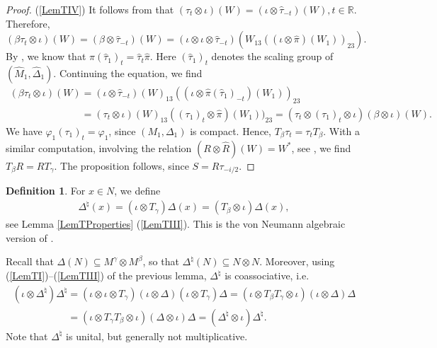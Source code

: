 \documentclass[pdftex]{sigma}
\numberwithin{equation}{section}
\theoremstyle{definition}
\newtheorem{dfn}[thm]{Definition}
\begin{document}
\begin{proof}
(\ref{LemTIV})
It follows from \cite[Proposition 2.1, Corollary 2.2]{KusVaeII} that $(\tau_t \otimes \iota)(W) = (\iota \otimes \hat{\tau}_{-t})(W), t \in \mathbb{R}$. Therefore,
\[
(\beta \tau_t \otimes \iota)(W) = (\beta \otimes \hat{\tau}_{-t})(W) = (\iota \otimes \iota \otimes \hat{\tau}_{-t})(W_{13}((\iota \otimes \hat{\pi})(W_1))_{23}).
\]
By \cite[Proposition 5.45]{KusVae}, we know that $\hat{\pi}(\hat{\tau}_1)_t = \hat{\tau}_t \hat{\pi}$. Here $(\hat{\tau}_1)_t$ denotes the scaling group of $(\hat{M}_1, \hat{\Delta}_1)$. Continuing the equation, we f\/ind
\begin{gather*}
  (\beta \tau_t \otimes \iota)(W)  = (\iota \otimes \hat{\tau}_{-t})(W)_{13} ((\iota \otimes   \hat{\pi}(\hat{\tau}_1)_{-t})(W_1))_{23} \\
\phantom{(\beta \tau_t \otimes \iota)(W)}{}
=  (\tau_t \otimes \iota)(W)_{13} ((\tau_1)_{t}\otimes \hat{\pi})(W_1))_{23} =
(\tau_t \otimes (\tau_1)_{t} \otimes \iota) (\beta \otimes \iota)(W).
\end{gather*}
We have $\varphi_1 (\tau_1)_t =  \varphi_1$, since $(M_1, \Delta_1)$ is compact. Hence, $T_\beta \tau_t = \tau_t T_\beta$. With a similar computation, involving the relation $(R \otimes \hat{R})(W) = W^\ast$, see \cite[Proposition 2.1, Corollary 2.2]{KusVaeII}, we f\/ind $T_\beta R = R T_\gamma$. The proposition follows, since $S = R \tau_{-i/2}$.
\end{proof}

\begin{dfn}
For $x \in N$, we def\/ine
\begin{gather}\label{EqnShiftedCom}
\Delta^\natural(x) = (\iota \otimes T_\gamma) \Delta(x) = (T_\beta \otimes \iota) \Delta(x),
\end{gather}
 see Lemma \ref{LemTProperties} (\ref{LemTIII}). This is the von Neumann algebraic version of \cite[equation~(4)]{VaiHyp}.
\end{dfn}
  Recall that $\Delta(N) \subseteq M^\gamma \otimes M^\beta$, so that $\Delta^\natural(N) \subseteq N \otimes N$. Moreover, using (\ref{LemTI})--(\ref{LemTIII}) of the previous lemma, $\Delta^\natural$ is coassociative, i.e.
\begin{gather}
   (\iota \otimes \Delta^\natural) \Delta^\natural  = (\iota \otimes \iota \otimes T_\gamma)(\iota \otimes \Delta)(\iota \otimes T_\gamma)\Delta
 = (\iota \otimes T_\beta   T_\gamma \otimes \iota) (\iota \otimes \Delta) \Delta \nonumber\\
\phantom{(\iota \otimes \Delta^\natural) \Delta^\natural }{}
=   (\iota \otimes T_\gamma   T_\beta \otimes \iota) (\Delta \otimes \iota) \Delta
 =  ( \Delta^\natural \otimes \iota) \Delta^\natural.\label{EqnCoas}
\end{gather}
Note that $\Delta^\natural$ is unital, but generally not multiplicative.
\end{document}
